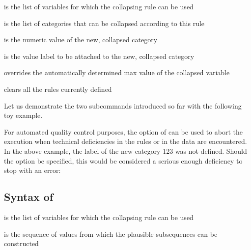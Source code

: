 \hangpara
{} is the list of variables for which the collapsing rule can be used

\hangpara
{} is the list of categories that can be collapsed according to this rule

\hangpara
{} is the numeric value of the new, collapsed category

\hangpara
{} is the value label to be attached to the new, collapsed category

\hangpara
{} overrides the automatically determined max value of the collapsed variable

\hangpara
{} clears all the rules currently defined

\bigskip

Let us demonstrate the two subcommands introduced so far with the following toy example.

\begin{stlog}
\nullskip
\end{stlog}

For automated quality control purposes, the  option
of  can be used to abort the execution
when technical deficiencies in the rules or in the data are encountered.
In the above example, the label of the new category 123 was not defined.
Should the  option be specified,
this would be considered a serious enough deficiency to stop with an error:

\begin{stlog}
\nullskip
\end{stlog}

\subsection{Syntax of }



\hangpara
{} is the list of variables for which the collapsing rule can be used

\hangpara
{} is the sequence of values from which the plausible subsequences can be constructed

